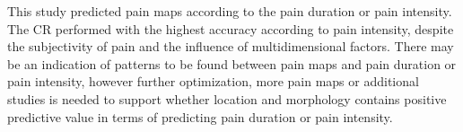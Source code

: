 This study predicted pain maps according to the pain duration or pain intensity.
The CR performed with the highest accuracy according to pain intensity, despite the subjectivity of pain and the influence of multidimensional factors.
There may be an indication of patterns to be found between pain maps and pain duration or pain intensity, however further optimization, more pain maps or additional studies is needed to support whether location and morphology contains positive predictive value in terms of predicting pain duration or pain intensity.



